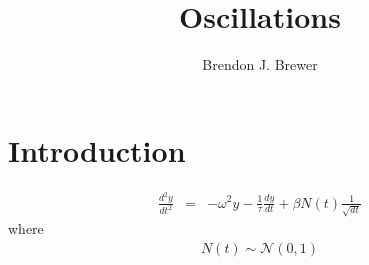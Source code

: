 \documentclass[letterpaper, 11pt]{article}
\title{Oscillations}
\author{Brendon J. Brewer}
\begin{document}
\maketitle

\section{Introduction}

\begin{eqnarray}
\frac{d^2y}{dt^2} &=& -\omega^2 y - \frac{1}{\tau}\frac{dy}{dt}
+ \beta N(t)\frac{1}{\sqrt{dt}}
\end{eqnarray}
where
\begin{eqnarray}
N(t) \sim \mathcal{N}(0, 1)
\end{eqnarray}
\end{document}
